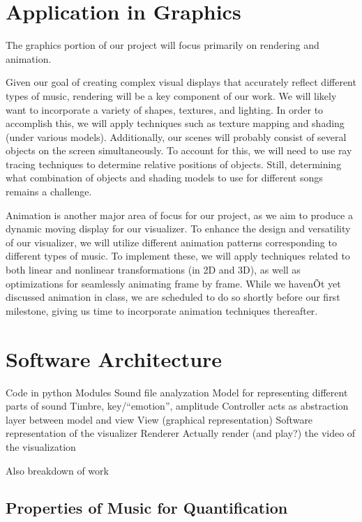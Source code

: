 \documentclass{article}
\begin{document}
\section{Application in Graphics}

The graphics portion of our project will focus primarily on rendering and animation.
 
Given our goal of creating complex visual displays that accurately reflect different types of music, rendering will be a key component of our work. We will likely want to incorporate a variety of shapes, textures, and lighting. In order to accomplish this, we will apply techniques such as texture mapping and shading (under various models). Additionally, our scenes will probably consist of several objects on the screen simultaneously. To account for this, we will need to use ray tracing techniques to determine relative positions of objects. Still, determining what combination of objects and shading models to use for different songs remains a challenge.
 
Animation is another major area of focus for our project, as we aim to produce a dynamic moving display for our visualizer. To enhance the design and versatility of our visualizer, we will utilize different animation patterns corresponding to different types of music. To implement these, we will apply techniques related to both linear and nonlinear transformations (in 2D and 3D), as well as optimizations for seamlessly animating frame by frame. While we havenÕt yet discussed animation in class, we are scheduled to do so shortly before our first milestone, giving us time to incorporate animation techniques thereafter.

\section{Software Architecture}

Code in python
Modules
Sound file analyzation
Model for representing different parts of sound
Timbre, key/``emotion'', amplitude
Controller acts as abstraction layer between model and view
View (graphical representation)
Software representation of the visualizer
Renderer
Actually render (and play?) the video of the visualization

Also breakdown of work

\subsection{Properties of Music for Quantification}
\end{document}
